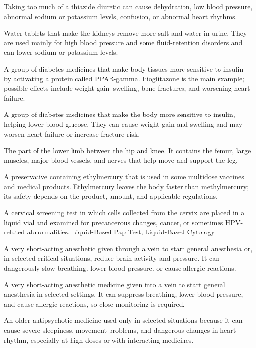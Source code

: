  Taking too much of a thiazide diuretic can cause dehydration, low blood pressure, abnormal sodium or potassium levels, confusion, or abnormal heart rhythms.

 Water tablets that make the kidneys remove more salt and water in urine. They are used mainly for high blood pressure and some fluid-retention disorders and can lower sodium or potassium levels.

 A group of diabetes medicines that make body tissues more sensitive to insulin by activating a protein called PPAR-gamma. Pioglitazone is the main example; possible effects include weight gain, swelling, bone fractures, and worsening heart failure.

 A group of diabetes medicines that make the body more sensitive to insulin, helping lower blood glucose. They can cause weight gain and swelling and may worsen heart failure or increase fracture risk.

 The part of the lower limb between the hip and knee. It contains the femur, large muscles, major blood vessels, and nerves that help move and support the leg.

 A preservative containing ethylmercury that is used in some multidose vaccines and medical products. Ethylmercury leaves the body faster than methylmercury; its safety depends on the product, amount, and applicable regulations.

 A cervical screening test in which cells collected from the cervix are placed in a liquid vial and examined for precancerous changes, cancer, or sometimes HPV-related abnormalities.
\synonyms
Liquid-Based Pap Test; Liquid-Based Cytology

 A very short-acting anesthetic given through a vein to start general anesthesia or, in selected critical situations, reduce brain activity and pressure. It can dangerously slow breathing, lower blood pressure, or cause allergic reactions.

 A very short-acting anesthetic medicine given into a vein to start general anesthesia in selected settings. It can suppress breathing, lower blood pressure, and cause allergic reactions, so close monitoring is required.

 An older antipsychotic medicine used only in selected situations because it can cause severe sleepiness, movement problems, and dangerous changes in heart rhythm, especially at high doses or with interacting medicines.

